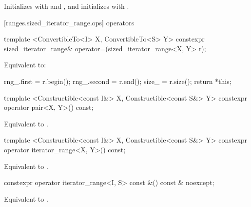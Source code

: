 \begin{itemdescr}
\pnum
\effects Initializes  with  and , and
initializes  with .
\end{itemdescr}

[ranges.sized_iterator_range.ops]{ operators}

%
\begin{itemdecl}
template <ConvertibleTo<I> X, ConvertibleTo<S> Y>
  constexpr sized_iterator_range& operator=(sized_iterator_range<X, Y> r);
\end{itemdecl}

\begin{itemdescr}
\pnum
\effects Equivalent to:
\begin{codeblock}
rng_.first = r.begin();
rng_.second = r.end();
size_ = r.size();
return *this;
\end{codeblock}
\end{itemdescr}

%
\begin{itemdecl}
template <Constructible<const I&> X, Constructible<const S&> Y>
  constexpr operator pair<X, Y>() const;
\end{itemdecl}

\begin{itemdescr}
\pnum
\returns Equivalent to .
\end{itemdescr}

%
\begin{itemdecl}
template <Constructible<const I&> X, Constructible<const S&> Y>
  constexpr operator iterator_range<X, Y>() const;
\end{itemdecl}

\begin{itemdescr}
\pnum
\returns Equivalent to .
\end{itemdescr}

%
\begin{itemdecl}
constexpr operator iterator_range<I, S> const &() const & noexcept;
\end{itemdecl}

\begin{itemdescr}
\pnum
\returns Equivalent to .
\end{itemdescr}

